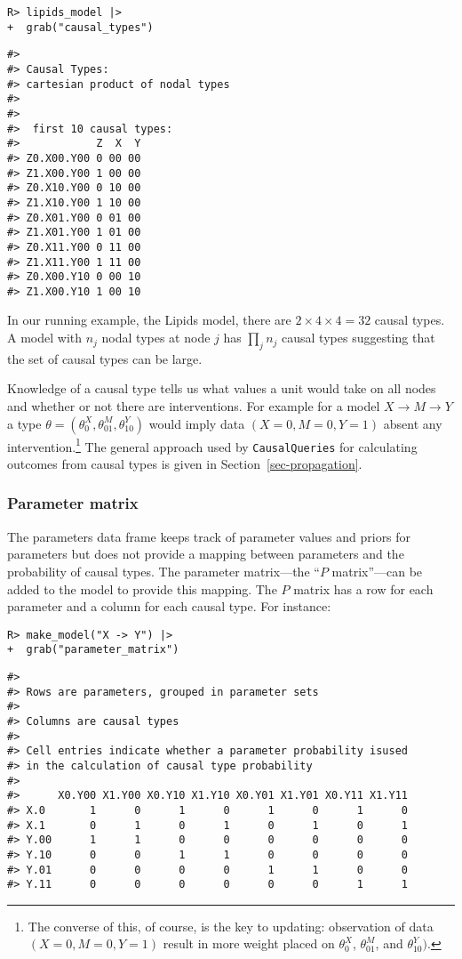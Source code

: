 \documentclass[
  11pt,
  article]{jss}
\begin{document}
\begin{verbatim}
R> lipids_model |> 
+  grab("causal_types")
\end{verbatim}

\begin{verbatim}
#> 
#> Causal Types: 
#> cartesian product of nodal types
#> 
#> 
#>  first 10 causal types: 
#>            Z  X  Y
#> Z0.X00.Y00 0 00 00
#> Z1.X00.Y00 1 00 00
#> Z0.X10.Y00 0 10 00
#> Z1.X10.Y00 1 10 00
#> Z0.X01.Y00 0 01 00
#> Z1.X01.Y00 1 01 00
#> Z0.X11.Y00 0 11 00
#> Z1.X11.Y00 1 11 00
#> Z0.X00.Y10 0 00 10
#> Z1.X00.Y10 1 00 10
\end{verbatim}

In our running example, the Lipids model, there are
\(2\times 4\times 4 = 32\) causal types. A model with \(n_j\) nodal
types at node \(j\) has \(\prod_j n_j\) causal types suggesting that the
set of causal types can be large.

Knowledge of a causal type tells us what values a unit would take on all
nodes and whether or not there are interventions. For example for a
model \(X \rightarrow M \rightarrow Y\) a type
\(\theta = (\theta^X_0, \theta^M_{01}, \theta^Y_{10})\) would imply data
\((X=0, M=0, Y=1)\) absent any intervention.\footnote{The converse of
  this, of course, is the key to updating: observation of data
  \((X=0, M=0, Y=1)\) result in more weight placed on \(\theta^X_0\),
  \(\theta^M_{01}\), and \(\theta^Y_{10})\).} The general approach used
by \texttt{CausalQueries} for calculating outcomes from causal types is
given in Section~\ref{sec-propagation}.

\subsubsection{Parameter matrix}\label{parameter-matrix}

The parameters data frame keeps track of parameter values and priors for
parameters but does not provide a mapping between parameters and the
probability of causal types. The parameter matrix---the ``\(P\)
matrix''---can be added to the model to provide this mapping. The \(P\)
matrix has a row for each parameter and a column for each causal type.
For instance:

\begin{verbatim}
R> make_model("X -> Y") |> 
+  grab("parameter_matrix")
\end{verbatim}

\begin{verbatim}
#> 
#> Rows are parameters, grouped in parameter sets
#> 
#> Columns are causal types
#> 
#> Cell entries indicate whether a parameter probability isused
#> in the calculation of causal type probability
#> 
#>      X0.Y00 X1.Y00 X0.Y10 X1.Y10 X0.Y01 X1.Y01 X0.Y11 X1.Y11
#> X.0       1      0      1      0      1      0      1      0
#> X.1       0      1      0      1      0      1      0      1
#> Y.00      1      1      0      0      0      0      0      0
#> Y.10      0      0      1      1      0      0      0      0
#> Y.01      0      0      0      0      1      1      0      0
#> Y.11      0      0      0      0      0      0      1      1
\end{verbatim}
\end{document}
